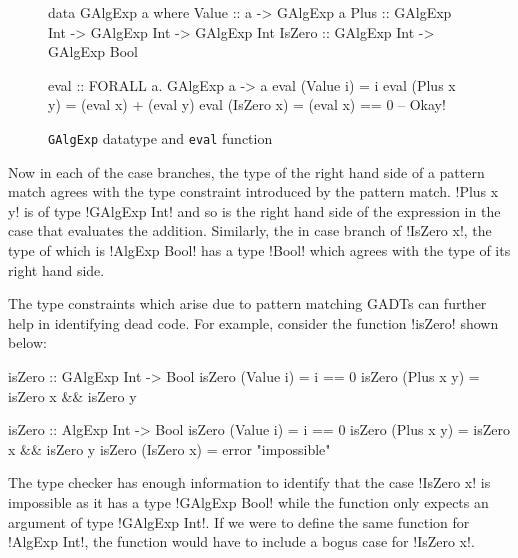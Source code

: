\documentclass[manuscript,screen,nonacm]{acmart}
\begin{document}
\begin{figure}[ht]
\centering
\begin{minipage}[ht]{0.6\linewidth}
\begin{code}
data GAlgExp a where
  Value  :: a                          -> GAlgExp a
  Plus   :: GAlgExp Int -> GAlgExp Int -> GAlgExp Int
  IsZero :: GAlgExp Int                -> GAlgExp Bool
\end{code}
\end{minipage}%
\begin{minipage}[ht]{0.4\linewidth}
\begin{code}
eval :: FORALL a. GAlgExp a -> a
eval (Value i) = i
eval (Plus x y) = (eval x) + (eval y)
eval (IsZero x) = (eval x) == 0 -- Okay!
\end{code}
\end{minipage}%
\caption{\texttt{GAlgExp} datatype and \texttt{eval} function}
\label{fig:galgexp-eval}
\end{figure}

Now in each of the case branches, the type of the right hand side of a pattern match agrees with the type constraint introduced by the pattern match. !Plus x y! is of type !GAlgExp Int! and so is the right hand side of the expression in the case that evaluates the addition. Similarly, the in case branch of !IsZero x!, the type of which is !AlgExp Bool! has a type !Bool! which agrees with the type of its right hand side.

The type constraints which arise due to pattern matching GADTs can further help in identifying dead code\cite{xi_dead_1998,graf_lower_2020}. For example, consider the function !isZero! shown below:

\begin{minipage}[ht]{0.5\linewidth}
\begin{CenteredBox}
\begin{code}
isZero :: GAlgExp Int -> Bool
isZero (Value i) = i == 0
isZero (Plus x y) = isZero x && isZero y
\end{code}
\end{CenteredBox}
\end{minipage}%
\begin{minipage}{0.5\linewidth}
\begin{code}
isZero :: AlgExp Int -> Bool
isZero (Value i) = i == 0
isZero (Plus x y) = isZero x && isZero y
isZero (IsZero x) = error "impossible"
\end{code}
\end{minipage}

The type checker has enough information to identify that the case !IsZero x! is impossible as it has a type !GAlgExp Bool! while the function only expects an argument of type !GAlgExp Int!. If we were to define the same function for !AlgExp Int!, the function would have to include a bogus case for !IsZero x!.
\end{document}
